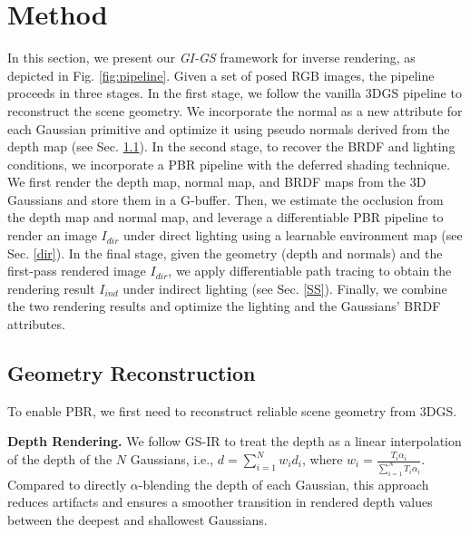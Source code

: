 \documentclass{article} %
\begin{document}
\section{Method}
In this section, we present our \textit{GI-GS} framework for inverse rendering, as depicted in Fig. \ref{fig:pipeline}. Given a set of posed RGB images, the pipeline proceeds in three stages. In the first stage, we follow the vanilla 3DGS pipeline to reconstruct the scene geometry. We incorporate the normal as a new attribute for each Gaussian primitive and optimize it using pseudo normals derived from the depth map (see Sec. \ref{geo}). In the second stage, to recover the BRDF and lighting conditions, we incorporate a PBR pipeline with the deferred shading technique. We first render the depth map, normal map, and BRDF maps from the 3D Gaussians and store them in a G-buffer. Then, we estimate the occlusion from the depth map and normal map, and leverage a differentiable PBR pipeline to render an image $I_{dir}$ under direct lighting using a learnable environment map (see Sec. \ref{dir}). In the final stage, given the geometry (depth and normals) and the first-pass rendered image $I_{dir}$, we apply differentiable path tracing to obtain the rendering result $I_{ind}$ under indirect lighting (see Sec. \ref{SS}). Finally, we combine the two rendering results and optimize the lighting and the Gaussians' BRDF attributes.
\subsection{Geometry Reconstruction}\label{geo}
To enable PBR, we first need to reconstruct reliable scene geometry from 3DGS.

\textbf{Depth Rendering.} We follow GS-IR \citep{gsir} to treat the depth as a linear interpolation of the depth of the $N$ Gaussians, i.e., $d=\sum_{i=1}^N w_i d_i$, where $w_i=\frac{T_i \alpha_i}{\sum_{i=1}^N T_i \alpha_i}$.
Compared to directly $\alpha$-blending the depth of each Gaussian, this approach reduces artifacts and ensures a smoother transition in rendered depth values between the deepest and shallowest Gaussians.
\end{document}
